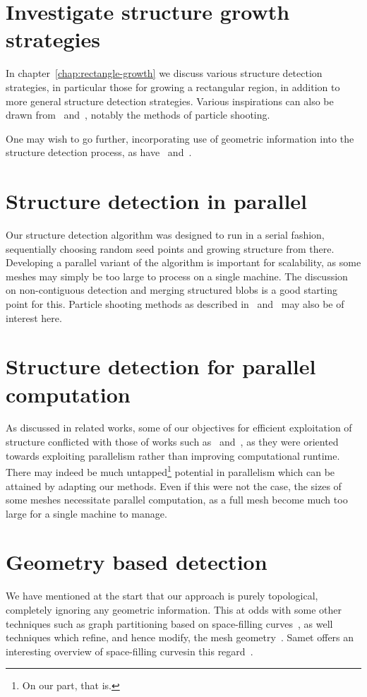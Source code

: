 \section{Investigate structure growth strategies}
In chapter~\ref{chap:rectangle-growth} we discuss various structure detection strategies, in particular those for growing a rectangular region, in addition to more general structure detection strategies. Various inspirations can also be drawn from~\cite{eppstein2008motorcycle} and~\cite{eppstein2008approximate}, notably the methods of particle shooting.

One may wish to go further, incorporating use of geometric information into the structure detection process, as have~\cite{makem2012automatic} and~\cite{rocca2011fast}.


\section{Structure detection in parallel}
Our structure detection algorithm was designed to run in a serial fashion, sequentially choosing random seed points and growing structure from there. Developing a parallel variant of the algorithm is important for scalability, as some meshes may simply be too large to process on a single machine. The discussion on non-contiguous detection and merging structured blobs is a good starting point for this. Particle shooting methods as described in~\cite{eppstein2008motorcycle} and~\cite{eppstein2008approximate} may also be of interest here.

\section{Structure detection for parallel computation}
As discussed in related works, some of our objectives for efficient exploitation of structure conflicted with those of works such as~\cite{bergen2004hierarchical} and~\cite{li2004hierarchical}, as they were oriented towards exploiting parallelism rather than improving computational runtime. There may indeed be much untapped\footnote{On our part, that is.} potential in parallelism which can be attained by adapting our methods. Even if this were not the case, the sizes of some meshes necessitate parallel computation, as a full mesh become much too large for a single machine to manage.


\section{Geometry based detection}
We have mentioned at the start that our approach is purely topological, completely ignoring any geometric information. This at odds with some other techniques such as graph partitioning based on space-filling curves~\cite{ridley2010guide}, as well techniques which refine, and hence modify, the mesh geometry~\cite{bergen2004hierarchical}. Samet offers an interesting overview of space-filling curvesin this regard~\cite{samet2006foundations}.


